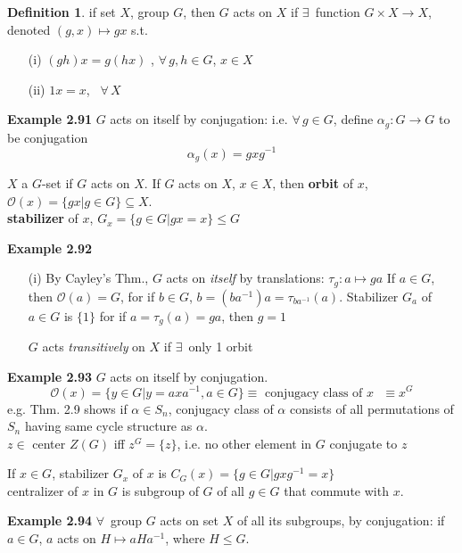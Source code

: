 \documentclass[twoside,landscape]{amsart}
\theoremstyle{plain}
\theoremstyle{definition}
\newtheorem{definition}{Definition}
\theoremstyle{remark}
\begin{document}
\begin{multicols*}{2}
\begin{definition} if set $X$, group $G$, then $G$ acts on $X$ if $\exists \, $ function $G\times X \to X$, denoted $(g,x) \mapsto gx$ s.t. 
\begin{enumerate}
\item[(i)] $(gh)x = g(hx)$ , $\forall \, g, h \in G$, $x\in X$
\item[(ii)] $1x = x$, \, $\forall \, X$
\end{enumerate}
\end{definition}

\textbf{Example 2.91} $G$ acts on itself by conjugation: i.e. $\forall \, g\in G$, define $\alpha_g : G \to G$ to be conjugation
\[
\alpha_g(x) = gxg^{-1}
\]



$X$ a $G$-set if $G$ acts on $X$.  If $G$ acts on $X$, $x\in X$, then \textbf{orbit} of $x$, $\mathcal{O}(x) = \lbrace gx | g\in G \rbrace \subseteq X$.  \\
\textbf{stabilizer} of $x$, $G_x = \lbrace g \in G|gx = x \rbrace \leq G$

\textbf{Example 2.92} 
\begin{enumerate}
\item[(i)] By Cayley's Thm., $G$ acts on \emph{itself} by translations: $\tau_g: a\mapsto ga$
If $a\in G$, then $\mathcal{O}(a) = G$, for if $b\in G$, $b=(ba^{-1})a = \tau_{ba^{-1}}(a)$.
Stabilizer $G_a$ of $a\in G$ is $\lbrace 1 \rbrace$ for if $a = \tau_g(a) = ga$, then $g=1$

$G$ acts \emph{transitively} on $X$ if $\exists \, $ only 1 orbit
\end{enumerate}

\textbf{Example 2.93} $G$ acts on itself by conjugation. 
\[
\mathcal{O}(x) = \lbrace y \in G | y = axa^{-1}, a \in G \rbrace \equiv \text{ conjugacy class of $x$ } \equiv x^G
\]
e.g. Thm. 2.9 shows if $\alpha \in S_n$, conjugacy class of $\alpha$ consists of all permutations of $S_n$ having same cycle structure as $\alpha$. \\
$z\in $ center $Z(G)$ iff $z^G = \lbrace z \rbrace$, i.e. no other element in $G$ conjugate to $z$

If $x\in G$, stabilizer $G_x$ of $x$ is $C_G(x) = \lbrace g\in G | gxg^{-1} = x\rbrace$ \\
centralizer of $x$ in $G$ is subgroup of $G$ of all $g\in G$ that commute with $x$.  

\textbf{Example 2.94} $\forall \, $ group $G$ acts on set $X$ of all its subgroups, by conjugation: if $a\in G$, $a$ acts on $H \mapsto aHa^{-1}$, where $H \leq G$.  


\end{multicols*}
\end{document}
